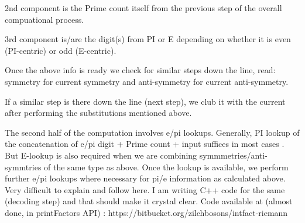 2nd component is the Prime count itself from the previous step of the overall compuational process.

3rd component is/are the digit(s) from PI or E depending on whether it is even (PI-centric) or odd (E-centric).

Once the above info is ready we check for similar steps down the line, read: symmetry for current symmetry and anti-symmetry for current anti-symmetry.

If a similar step is there down the line (next step), we club it with the current after performing the substitutions mentioned above.

The second half of the computation involves e/pi lookups. Generally, PI lookup of the concatenation of e/pi digit + Prime count + input suffices in most cases .
But E-lookup is also required when we are combining symmmetries/anti-symmtries of the same type as above.
Once the lookup is available, we perform further e/pi lookups where necessary for pi/e information as calculated above.
Very difficult to explain and follow here. I am writing C++ code for the same (decoding step) and that should make it crystal clear.
Code available at (almost done, in printFactors API) : https://bitbucket.org/zilchbosons/intfact-riemann


